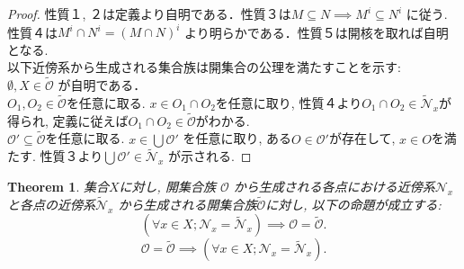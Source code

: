 \documentclass[lualatex]{ltjsbook}
\newtheorem{theorem}{Theorem}[chapter]
\theoremstyle{remark}
\theoremstyle{plain}
\begin{document}
\begin{proof}
	性質１,  ２は定義より自明である．性質３は$M\subseteq N \implies M^{i} \subseteq N^{i}$ に従う. 性質４は$M^{i}\cap N^{i} = \left( M \cap N \right) ^{i}$ より明らかである．性質５は開核を取れば自明となる.\\
	以下近傍系から生成される集合族は開集合の公理を満たすことを示す:\\
	$\emptyset , X \in \tilde{\mathcal{O}}$ が自明である．\\
	$O_1 , O_2 \in \tilde{\mathcal{O}}$を任意に取る. 
	$x \in O_1 \cap O_2$を任意に取り,  性質４より$O_1 \cap O_2 \in \mathcal{\tilde{N}}_x$が得られ,  定義に従えば$O_1 \cap O_2 \in \tilde{\mathcal{O}}$がわかる.\\
	$\mathcal{O}' \subseteq \tilde{\mathcal{O}}$を任意に取る.
	$x \in \bigcup \mathcal{O}'  $ を任意に取り, 
	ある$O \in \mathcal{O}'$が存在して,  $x \in O$を満たす. 性質３より$\bigcup \mathcal{O}' \in \mathcal{\tilde{N}}_x$ が示される.
\end{proof}

\begin{theorem}
	集合$X$に対し,  開集合族 $\mathcal{O}$ から生成される各点における近傍系$\mathcal{N}_x$ 
	と各点の近傍系$\mathcal{\tilde{N}}_x$ から生成される開集合族$\tilde{\mathcal{O}}$に対し,  以下の命題が成立する:
	\[
		\left( \forall x \in X; \mathcal{N}_x = \mathcal{\tilde{N}}_x \right) \implies \mathcal{O} = \tilde{\mathcal{O}}
	.\] 
	\[
	\mathcal{O} = \tilde{\mathcal{O}} \implies \left( \forall x \in X; \mathcal{N}_x = \mathcal{\tilde{N}}_x \right)
	.\] 
\end{theorem}
\end{document}

